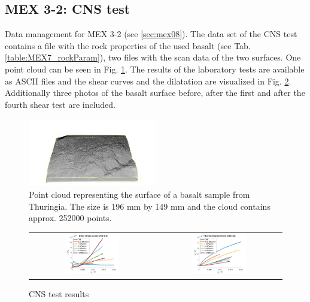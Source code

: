 \subsection{MEX 3-2: CNS test}\label{DataManMex3-2CNS}

Data management for MEX 3-2 (see \ref{sec:mex08}).
The data set of the CNS test contains a file with the rock properties of the used basalt (see Tab. \ref{table:MEX7_rockParam}), two files with the scan data of the two surfaces. One point cloud can be seen in Fig. \ref{fig:DataCNSBasaltPointCloud}. The results of the laboratory tests are available as ASCII files and the shear curves and the dilatation are visualized in Fig. \ref{fig:DataCNSBasaltLab}. Additionally three photos of the basalt surface before, after the first and after the fourth shear test are included. 

\begin{figure}[!ht]
\begin{center}
\includegraphics[width=0.5\textwidth]{./figures/MEX3-2PointCloud.png}
\end{center}
\caption{Point cloud representing the surface of a basalt sample from Thuringia. The size is 196 mm by 149 mm and the cloud contains approx. 252000 points.}
\label{fig:DataCNSBasaltPointCloud}
\end{figure}

\begin{figure}[!ht]
\begin{tabular}{cc}
\includegraphics[width=0.45\textwidth]{./figures/CNSShearCurvesAll.png}     
& 
\includegraphics[width=0.45\textwidth]{./figures/CNSDilatationAll.png} 
\end{tabular}
\caption{CNS test results}
\label{fig:DataCNSBasaltLab}
\end{figure}

